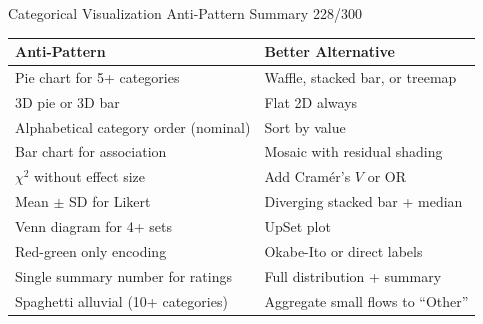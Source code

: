 \documentclass[10pt]{beamer}
\newcommand{\smark}[1]{\hfill{\scriptsize\color{codegray}#1}}
\begin{document}
\begin{frame}{Categorical Visualization Anti-Pattern Summary}
\smark{228/300}
\centering\small
\begin{tabular}{@{}ll@{}}
    \toprule
    \textbf{Anti-Pattern} & \textbf{Better Alternative} \\
    \midrule
    Pie chart for 5+ categories                 & Waffle, stacked bar, or treemap \\
    3D pie or 3D bar                            & Flat 2D always \\
    Alphabetical category order (nominal)       & Sort by value \\
    Bar chart for association                    & Mosaic with residual shading \\
    $\chi^2$ without effect size                & Add Cramér's $V$ or OR \\
    Mean $\pm$ SD for Likert                    & Diverging stacked bar + median \\
    Venn diagram for 4+ sets                    & UpSet plot \\
    Red-green only encoding                     & Okabe-Ito or direct labels \\
    Single summary number for ratings           & Full distribution + summary \\
    Spaghetti alluvial (10+ categories)         & Aggregate small flows to ``Other'' \\
    \bottomrule
\end{tabular}
\end{frame}
\end{document}
